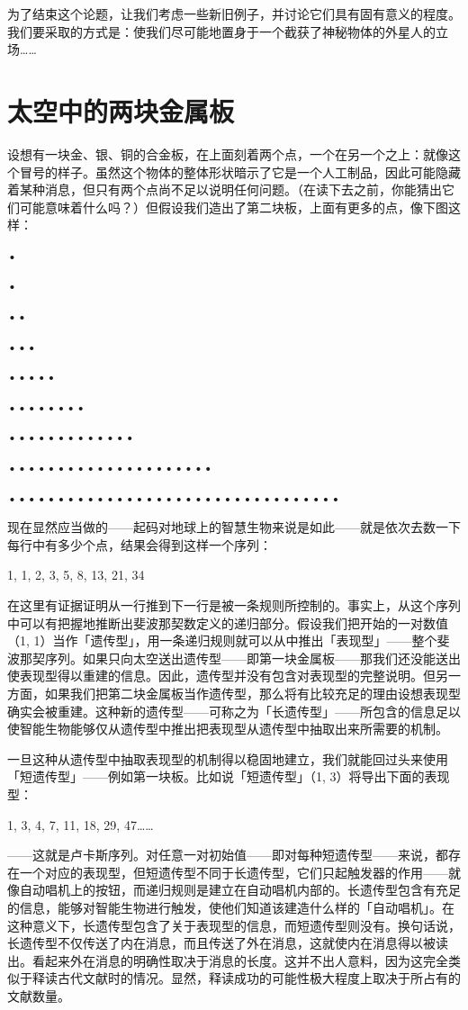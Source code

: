 \documentclass[
  12pt,
  twoside,
  openright,
  oldfontcommands,
]{memoir}
\begin{document}
为了结束这个论题，让我们考虑一些新旧例子，并讨论它们具有固有意义的程度。我们要采取的方式是：使我们尽可能地置身于一个截获了神秘物体的外星人的立场\ldots\ldots{}

\section{太空中的两块金属板}

设想有一块金、银、铜的合金板，在上面刻着两个点，一个在另一个之上：就像这个冒号的样子。虽然这个物体的整体形状暗示了它是一个人工制品，因此可能隐藏着某种消息，但只有两个点尚不足以说明任何问题。（在读下去之前，你能猜出它们可能意味着什么吗？）但假设我们造出了第二块板，上面有更多的点，像下图这样：

•

•

••

•••

•••••

••••••••

•••••••••••••

•••••••••••••••••••••

••••••••••••••••••••••••••••••••••

现在显然应当做的------起码对地球上的智慧生物来说是如此------就是依次去数一下每行中有多少个点，结果会得到这样一个序列：

1, 1, 2, 3, 5, 8, 13, 21, 34

在这里有证据证明从一行推到下一行是被一条规则所控制的。事实上，从这个序列中可以有把握地推断出斐波那契数定义的递归部分。假设我们把开始的一对数值（1,
1）当作「遗传型」，用一条递归规则就可以从中推出「表现型」------整个斐波那契序列。如果只向太空送出遗传型------即第一块金属板------那我们还没能送出使表现型得以重建的信息。因此，遗传型并没有包含对表现型的完整说明。但另一方面，如果我们把第二块金属板当作遗传型，那么将有比较充足的理由设想表现型确实会被重建。这种新的遗传型------可称之为「长遗传型」------所包含的信息足以使智能生物能够仅从遗传型中推出把表现型从遗传型中抽取出来所需要的机制。

一旦这种从遗传型中抽取表现型的机制得以稳固地建立，我们就能回过头来使用「短遗传型」------例如第一块板。比如说「短遗传型」（1,
3）将导出下面的表现型：

1, 3, 4, 7, 11, 18, 29, 47\ldots\ldots{}

------这就是卢卡斯序列。对任意一对初始值------即对每种短遗传型------来说，都存在一个对应的表现型，但短遗传型不同于长遗传型，它们只起触发器的作用------就像自动唱机上的按钮，而递归规则是建立在自动唱机内部的。长遗传型包含有充足的信息，能够对智能生物进行触发，使他们知道该建造什么样的「自动唱机」。在这种意义下，长遗传型包含了关于表现型的信息，而短遗传型则没有。换句话说，长遗传型不仅传送了内在消息，而且传送了外在消息，这就使内在消息得以被读出。看起来外在消息的明确性取决于消息的长度。这并不出人意料，因为这完全类似于释读古代文献时的情况。显然，释读成功的可能性极大程度上取决于所占有的文献数量。
\end{document}
